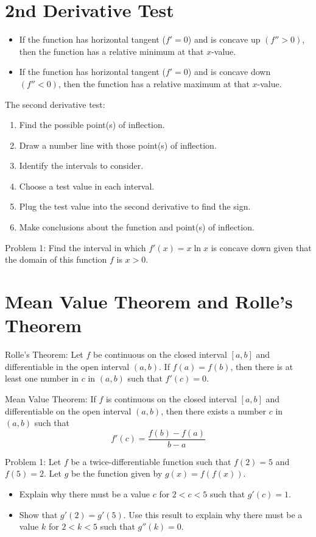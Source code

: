 \documentclass[../abcalc.tex]{subfiles}
\begin{document}
\section{2nd Derivative Test}
\begin{itemize}
    \item If the function has horizontal tangent ($f'=0$) and is concave up $(f''>0)$, then the function has a relative minimum at that $x$-value.
    \item If the function has horizontal tangent ($f'=0$) and is concave down $(f''<0)$, then the function has a relative maximum at that $x$-value.
\end{itemize}

The second derivative test:
\begin{enumerate}
    \item Find the possible point(s) of inflection.
    \item Draw a number line with those point(s) of inflection.
    \item Identify the intervals to consider.
    \item Choose a test value in each interval.
    \item Plug the test value into the second derivative to find the sign.
    \item Make conclusions about the function and point(s) of inflection.
\end{enumerate}

Problem 1: Find the interval in which $f'(x)=x \ln x$ is concave down given that the domain of this function $f$ is $x>0$.
\section{Mean Value Theorem and Rolle's Theorem}
\begin{theorem}
    Rolle's Theorem: Let $f$ be continuous on the closed interval $[a,b]$ and differentiable in the open interval $(a,b)$.
    If $f(a) = f(b)$, then there is at least one number in $c$ in $(a,b)$ such that $f'(c)=0$.
\end{theorem}
\begin{theorem}
    Mean Value Theorem: If $f$ is continuous on the closed interval $[a,b]$ and differentiable on the open interval $(a,b)$, then there exists 
    a number $c$ in $(a,b)$ such that 
    \[f'(c)=\frac{f(b)-f(a)}{b-a}\]
\end{theorem}

Problem 1: Let $f$ be a twice-differentiable function such that $f(2)=5$ and $f(5)=2$. Let $g$ be the function given by $g(x)=f(f(x))$.
\begin{itemize}
    \item Explain why there must be a value $c$ for $2<c<5$ such that $g'(c)=1$.
    \item Show that $g'(2)=g'(5)$. Use this result to explain why there must be a value $k$ for $2<k<5$ such that $g''(k)=0$.
\end{itemize}
\end{document}
